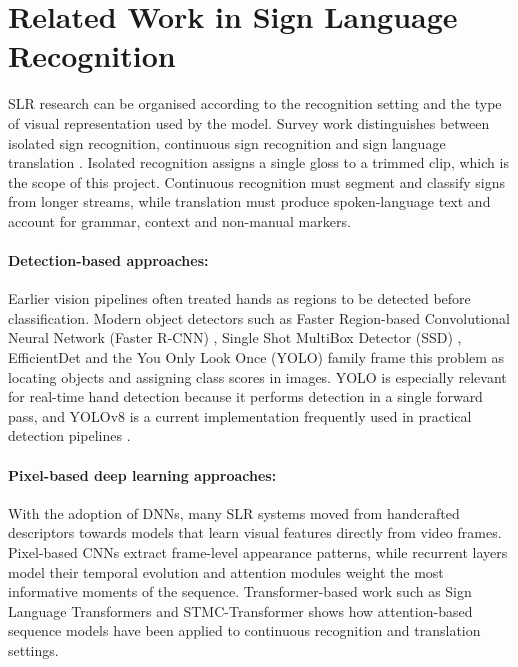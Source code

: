 \section{Related Work in Sign Language Recognition}
\label{sec:related_slr_work}

SLR research can be organised according to the recognition setting and the type of visual
representation used by the model. Survey work distinguishes between isolated sign recognition,
continuous sign recognition and sign language translation \cite{koller2020signlanguage,
rastgoo2021signlanguage,bragg2019signlanguagerecognition}. Isolated recognition assigns a single
gloss to a trimmed clip, which is the scope of this project. Continuous recognition must segment
and classify signs from longer streams, while translation must produce spoken-language text and
account for grammar, context and non-manual markers.

\paragraph{Detection-based approaches:}
Earlier vision pipelines often treated hands as regions to be detected before classification.
Modern object detectors such as Faster Region-based Convolutional Neural Network (Faster R-CNN)
\cite{ren2015fasterrcnn}, Single Shot MultiBox Detector (SSD) \cite{liu2016ssd}, EfficientDet
\cite{tan2020efficientdet} and the You Only Look Once (YOLO) family
\cite{redmon2016yolo,redmon2018yolov3} frame this problem as locating objects and assigning class
scores in images. YOLO is especially relevant for real-time hand detection because it performs
detection in a single forward pass, and YOLOv8 is a current implementation frequently used in
practical detection pipelines \cite{jocher2023yolov8}.

\paragraph{Pixel-based deep learning approaches:}
With the adoption of DNNs, many SLR systems moved from handcrafted descriptors towards models that
learn visual features directly from video frames. Pixel-based CNNs extract frame-level appearance
patterns, while recurrent layers model their temporal evolution and attention modules weight the
most informative moments of the sequence. Transformer-based work such as Sign Language Transformers
\cite{camgoz2020signlanguagetransformers} and STMC-Transformer \cite{yin2020stmc} shows how
attention-based sequence models have been applied to continuous recognition and translation
settings.

